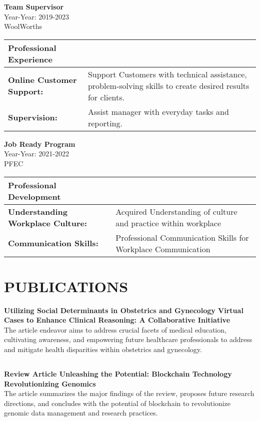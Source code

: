 \documentclass[a4paper,9pt]{article}
\begin{document}
\noindent
\textbf{Team Supervisor} \\
Year-Year: 2019-2023 \\
WoolWorths \\
\begin{tabular}{|p{}|p{}|}
\hline
\textbf{Professional Experience} & \\
\hline
\textbf{Online Customer Support:} & Support Customers with technical assistance, problem-solving skills to create desired results for clients. \\
\hline
\textbf{Supervision:} & Assist manager with everyday tasks and reporting. \\
\hline
\end{tabular}
\vspace{6\baselineskip}

\noindent
\textbf{Job Ready Program} \\
Year-Year: 2021-2022 \\
PFEC \\
\begin{tabular}{|p{}|p{}|}
\hline
\textbf{Professional Development} & \\
\hline
\textbf{Understanding Workplace Culture:} & Acquired Understanding of culture and practice within workplace \\
\hline
\textbf{Communication Skills:} & Professional Communication Skills for Workplace Communication \\
\hline
\end{tabular}



\section*{PUBLICATIONS}

\textbf{Utilizing Social Determinants in Obstetrics and Gynecology Virtual Cases to Enhance Clinical Reasoning: A Collaborative Initiative} \\
The article endeavor aims to address crucial facets of medical education, cultivating awareness, and empowering future healthcare professionals to address and mitigate health disparities within obstetrics and gynecology.

\subsection*{} 
\textbf{Review Article Unleashing the Potential: Blockchain Technology Revolutionizing Genomics} \\
The article summarizes the major findings of the review, proposes future research directions, and concludes with the potential of blockchain to revolutionize genomic data management and research practices.
\end{document}
